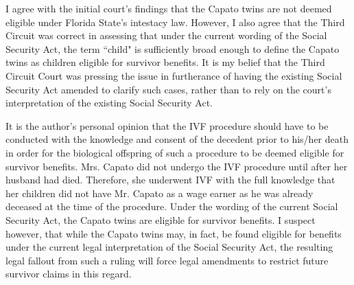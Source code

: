 \documentclass[letterpaper,10pt,twoside]{article}
\begin{document}
I agree with the initial court's findings that the Capato twins are not deemed eligible under Florida State's intestacy law.  However, I also agree that the Third Circuit was correct in assessing that under the current wording of the Social Security Act, the term ``child" is  sufficiently broad enough to define the Capato twins as children eligible for survivor benefits.  It is my belief that the Third Circuit Court was pressing the issue in furtherance of having the existing Social Security Act amended to clarify such cases, rather than to rely on the court's interpretation of the existing Social Security Act.

It is the author's personal opinion that the IVF procedure should have to be conducted with the knowledge and consent of the decedent prior to his/her death in order for the biological offspring of such a procedure to be deemed eligible for survivor benefits.  Mrs. Capato did not undergo the IVF procedure until after her husband had died.  Therefore, she underwent IVF with the full knowledge that her children did not have Mr. Capato as a wage earner as he was already deceased at the time of the procedure.  Under the wording of the current Social Security Act, the Capato twins are eligible for survivor benefits.  I suspect however, that while the Capato twins may, in fact, be found eligible for benefits under the current legal interpretation of the Social Security Act, the resulting legal fallout from such a ruling will force legal amendments to restrict future survivor claims in this regard.
\end{document}
